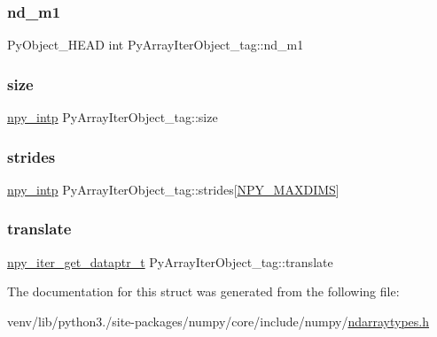 \subsubsection{\texorpdfstring{nd\+\_\+m1}{nd\_m1}}
{\footnotesize\ttfamily Py\+Object\+\_\+\+H\+E\+AD int Py\+Array\+Iter\+Object\+\_\+tag\+::nd\+\_\+m1}

\mbox{\label{structPyArrayIterObject__tag_a7b184f040a3c394855de406fa4fb9f61}} 
\subsubsection{\texorpdfstring{size}{size}}
{\footnotesize\ttfamily \hyperlink{npy__common_8h_a2d6effc4d5ecb85675ebfcfaa102b483}{npy\+\_\+intp} Py\+Array\+Iter\+Object\+\_\+tag\+::size}

\mbox{\label{structPyArrayIterObject__tag_a4ba9df5199b02c00643cbe88d6167efe}} 
\subsubsection{\texorpdfstring{strides}{strides}}
{\footnotesize\ttfamily \hyperlink{npy__common_8h_a2d6effc4d5ecb85675ebfcfaa102b483}{npy\+\_\+intp} Py\+Array\+Iter\+Object\+\_\+tag\+::strides\mbox{[}\hyperlink{ndarraytypes_8h_a737679ea9ee902bfa707c146051c17b5}{N\+P\+Y\+\_\+\+M\+A\+X\+D\+I\+MS}\mbox{]}}

\mbox{\label{structPyArrayIterObject__tag_a3b7bd1e1c71e7eef2513b65770cf9aa3}} 
\subsubsection{\texorpdfstring{translate}{translate}}
{\footnotesize\ttfamily \hyperlink{ndarraytypes_8h_ac00f3035372c5ae1bc9e6187aa135818}{npy\+\_\+iter\+\_\+get\+\_\+dataptr\+\_\+t} Py\+Array\+Iter\+Object\+\_\+tag\+::translate}



The documentation for this struct was generated from the following file\+:\begin{DoxyCompactItemize}
\item 
venv/lib/python3./site-\/packages/numpy/core/include/numpy/\hyperlink{ndarraytypes_8h}{ndarraytypes.\+h}\end{DoxyCompactItemize}
